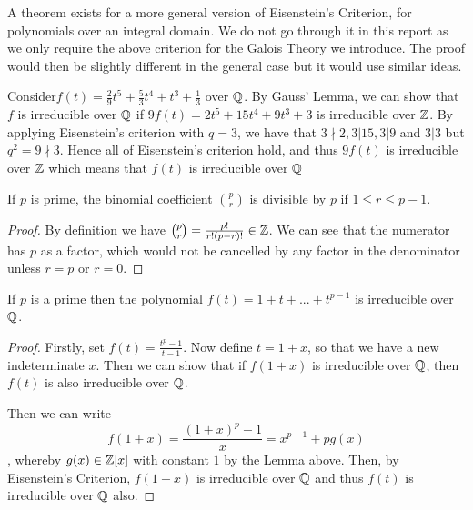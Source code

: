A theorem exists for a more general version of Eisenstein's Criterion, for polynomials over an integral domain. We do not go through it in this report as we only require the above criterion for the Galois Theory we introduce. The proof would then be slightly different in the general case but it would use similar ideas.

\begin{example}
Consider$
f(t) = \frac{2}{9} t^5 + \frac{5}{3} t^4 + t^3 + \frac{1}{3}$ over $\mathbb Q$. By Gauss' Lemma, we can show that $f$ is irreducible over $\mathbb Q$ if $
9f(t) = 2t^5 + 15t^4 + 9t^3 + 3
$ is irreducible over $\mathbb Z$. By applying Eisenstein's criterion with $q = 3$, we have that $3 \nmid 2, 3|15, 3|9 $ and $3|3$ but $q^2 = 9 \nmid 3$. Hence all of Eisenstein's criterion hold, and thus $9f(t)$ is irreducible over $\mathbb Z$ which means that $f(t)$ is irreducible over $\mathbb Q$

\end{example}

\begin{lemma}
If $p$ is prime, the binomial coefficient $\binom{p}{r}$ is divisible by $p$ if $1 \le r \le p-1$.
\end{lemma}

\begin{proof}
By definition we have $\binom{p}{r} = \frac{p!}{r!(p-r)!} \in \mathbb Z$. We can see that the numerator has $p$ as a factor, which would not be cancelled by any factor in the denominator unless $r=p$ or $r=0$.
\end{proof}

\begin{theorem}\label{thm:irreducible-prime-polynomial}
    If $p$ is a prime then the polynomial
    $
    f(t) = 1 + t + ... + t^{p-1}
    $
    is irreducible over $\mathbb Q$.
\end{theorem}

\begin{proof}
Firstly, set $f(t) = \frac{t^p - 1}{t - 1}$. 
Now define $t =1+x$, so that we have a new indeterminate $x$. Then we can show that if $f(1+x)$ is irreducible over $\mathbb Q$, then $f(t)$ is also irreducible over $\mathbb Q$.

Then we can write $$f(1+x)=\frac{(1+x)^p - 1}{x}  = x^{p-1} + pg(x)$$, whereby $g(x)\in \mathbb Z[x]$ with constant $1$ by the Lemma above. Then, by Eisenstein's Criterion, $f(1+x)$ is irreducible over $\mathbb Q$ and thus $f(t)$ is irreducible over $\mathbb Q$ also.

\end{proof}



